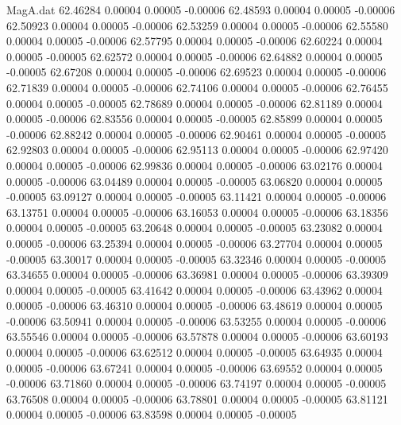 \begin{filecontents}{MagA.dat}
  62.46284    0.00004    0.00005   -0.00006
  62.48593    0.00004    0.00005   -0.00006
  62.50923    0.00004    0.00005   -0.00006
  62.53259    0.00004    0.00005   -0.00006
  62.55580    0.00004    0.00005   -0.00006
  62.57795    0.00004    0.00005   -0.00006
  62.60224    0.00004    0.00005   -0.00005
  62.62572    0.00004    0.00005   -0.00006
  62.64882    0.00004    0.00005   -0.00005
  62.67208    0.00004    0.00005   -0.00006
  62.69523    0.00004    0.00005   -0.00006
  62.71839    0.00004    0.00005   -0.00006
  62.74106    0.00004    0.00005   -0.00006
  62.76455    0.00004    0.00005   -0.00005
  62.78689    0.00004    0.00005   -0.00006
  62.81189    0.00004    0.00005   -0.00006
  62.83556    0.00004    0.00005   -0.00005
  62.85899    0.00004    0.00005   -0.00006
  62.88242    0.00004    0.00005   -0.00006
  62.90461    0.00004    0.00005   -0.00005
  62.92803    0.00004    0.00005   -0.00006
  62.95113    0.00004    0.00005   -0.00006
  62.97420    0.00004    0.00005   -0.00006
  62.99836    0.00004    0.00005   -0.00006
  63.02176    0.00004    0.00005   -0.00006
  63.04489    0.00004    0.00005   -0.00005
  63.06820    0.00004    0.00005   -0.00005
  63.09127    0.00004    0.00005   -0.00005
  63.11421    0.00004    0.00005   -0.00006
  63.13751    0.00004    0.00005   -0.00006
  63.16053    0.00004    0.00005   -0.00006
  63.18356    0.00004    0.00005   -0.00005
  63.20648    0.00004    0.00005   -0.00005
  63.23082    0.00004    0.00005   -0.00006
  63.25394    0.00004    0.00005   -0.00006
  63.27704    0.00004    0.00005   -0.00005
  63.30017    0.00004    0.00005   -0.00005
  63.32346    0.00004    0.00005   -0.00005
  63.34655    0.00004    0.00005   -0.00006
  63.36981    0.00004    0.00005   -0.00006
  63.39309    0.00004    0.00005   -0.00005
  63.41642    0.00004    0.00005   -0.00006
  63.43962    0.00004    0.00005   -0.00006
  63.46310    0.00004    0.00005   -0.00006
  63.48619    0.00004    0.00005   -0.00006
  63.50941    0.00004    0.00005   -0.00006
  63.53255    0.00004    0.00005   -0.00006
  63.55546    0.00004    0.00005   -0.00006
  63.57878    0.00004    0.00005   -0.00006
  63.60193    0.00004    0.00005   -0.00006
  63.62512    0.00004    0.00005   -0.00005
  63.64935    0.00004    0.00005   -0.00006
  63.67241    0.00004    0.00005   -0.00006
  63.69552    0.00004    0.00005   -0.00006
  63.71860    0.00004    0.00005   -0.00006
  63.74197    0.00004    0.00005   -0.00005
  63.76508    0.00004    0.00005   -0.00006
  63.78801    0.00004    0.00005   -0.00005
  63.81121    0.00004    0.00005   -0.00006
  63.83598    0.00004    0.00005   -0.00005

\end{filecontents}
